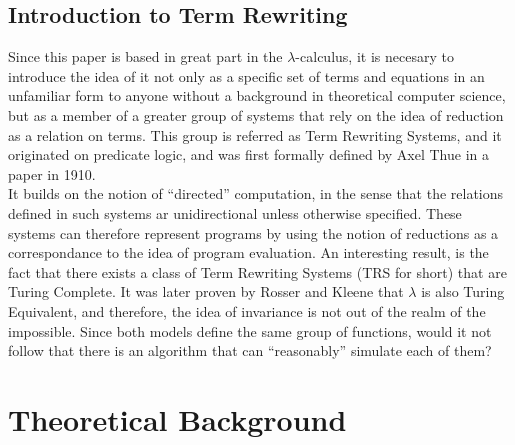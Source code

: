 \documentclass[12pt]{article}
\begin{document}
\subsection{Introduction to Term Rewriting}
Since this paper is based in great part in the $\lambda$-calculus, it is necesary to introduce the idea of it not only as a specific set of terms and equations in an unfamiliar form to anyone without a background in theoretical computer science, but as a member of a greater group of systems that rely on the idea of reduction as a relation on terms. This group is referred as Term Rewriting Systems, and it originated on predicate logic, and was first formally defined by Axel Thue in a paper in 1910.\\
It builds on the notion of \enquote{directed} computation, in the sense that the relations defined in such systems ar unidirectional unless otherwise specified. These systems can therefore represent programs by using the notion of reductions as a correspondance to the idea of program evaluation. An interesting result, is the fact that there exists a class of Term Rewriting Systems (TRS for short) that are Turing Complete. It was later proven by Rosser and Kleene that $\lambda$ is also Turing Equivalent, and therefore, the idea of invariance is not out of the realm of the impossible. Since both models define the same group of functions, would it not follow that there is an algorithm that can \enquote{reasonably} simulate each of them? \\

\section{Theoretical Background}\label{theoretical-background}
\end{document}
